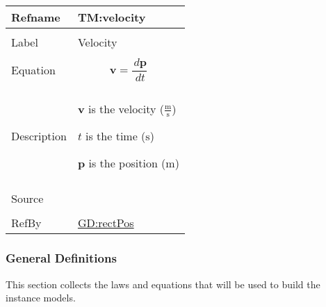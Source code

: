 \documentclass[12pt]{article}
\begin{document}
\begin{minipage}{\textwidth}
\begin{tabular}{>{\raggedright}p{}>{\raggedright\arraybackslash}p{}}
\toprule \textbf{Refname} & \textbf{TM:velocity}
\label{TM:velocity}
\\ \midrule \\
Label & Velocity
        
\\ \midrule \\
Equation & \begin{displaymath}
           \mathbf{v}=\frac{\,d\mathbf{p}}{\,dt}
           \end{displaymath}
\\ \midrule \\
Description & \begin{symbDescription}
              \item{$\mathbf{v}$ is the velocity ($\frac{\text{m}}{\text{s}}$)}
              \item{$t$ is the time (${\text{s}}$)}
              \item{$\mathbf{p}$ is the position (${\text{m}}$)}
              \end{symbDescription}
\\ \midrule \\
Source & \cite{velocityWiki}
         
\\ \midrule \\
RefBy & \hyperref[GD:rectPos]{GD:rectPos}
        
\\ \bottomrule
\end{tabular}
\end{minipage}
\subsubsection{General Definitions}
\label{Sec:GDs}
This section collects the laws and equations that will be used to build the instance models.
\end{document}
